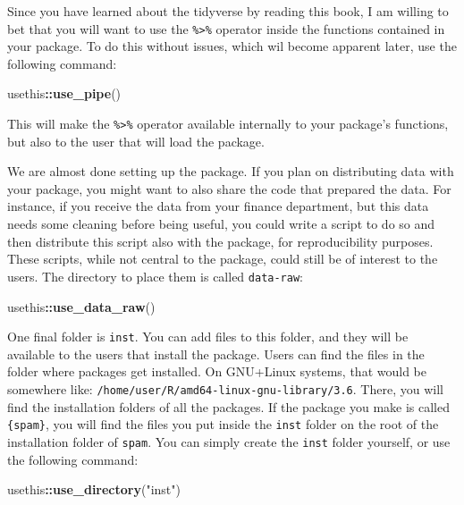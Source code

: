 \documentclass[
]{article}
\newenvironment{Shaded}{\begin{snugshade}}{\end{snugshade}}
\newcommand{\KeywordTok}[1]{\textcolor[rgb]{0.13,0.29,0.53}{\textbf{#1}}}
\newcommand{\NormalTok}[1]{#1}
\newcommand{\OperatorTok}[1]{\textcolor[rgb]{0.81,0.36,0.00}{\textbf{#1}}}
\newcommand{\StringTok}[1]{\textcolor[rgb]{0.31,0.60,0.02}{#1}}
\begin{document}
Since you have learned about the tidyverse by reading this book, I am willing to bet that you will
want to use the \texttt{\%\textgreater{}\%} operator inside the functions contained in your package. To do this without issues,
which wil become apparent later, use the following command:

\begin{Shaded}
\begin{Highlighting}[]
\NormalTok{usethis}\OperatorTok{::}\KeywordTok{use\_pipe}\NormalTok{()}
\end{Highlighting}
\end{Shaded}

This will make the \texttt{\%\textgreater{}\%} operator available internally to your package's functions, but also to the
user that will load the package.

We are almost done setting up the package. If you plan on distributing data with your package,
you might want to also share the code that prepared the data. For instance, if you receive the
data from your finance department, but this data needs some cleaning before being useful, you could
write a script to do so and then distribute this script also with the package, for reproducibility
purposes. These scripts, while not central to the package, could still be of interest to the users.
The directory to place them is called \texttt{data-raw}:

\begin{Shaded}
\begin{Highlighting}[]
\NormalTok{usethis}\OperatorTok{::}\KeywordTok{use\_data\_raw}\NormalTok{()}
\end{Highlighting}
\end{Shaded}

One final folder is \texttt{inst}. You can add files to this folder, and they will be available to the users
that install the package. Users can find the files in the folder where packages get installed. On
GNU+Linux systems, that would be somewhere like: \texttt{/home/user/R/amd64-linux-gnu-library/3.6}. There,
you will find the installation folders of all the packages. If the package you make is called \texttt{\{spam\}},
you will find the files you put inside the \texttt{inst} folder on the root of the installation folder of
\texttt{spam}. You can simply create the \texttt{inst} folder yourself, or use the following command:

\begin{Shaded}
\begin{Highlighting}[]
\NormalTok{usethis}\OperatorTok{::}\KeywordTok{use\_directory}\NormalTok{(}\StringTok{"inst"}\NormalTok{)}
\end{Highlighting}
\end{Shaded}
\end{document}
